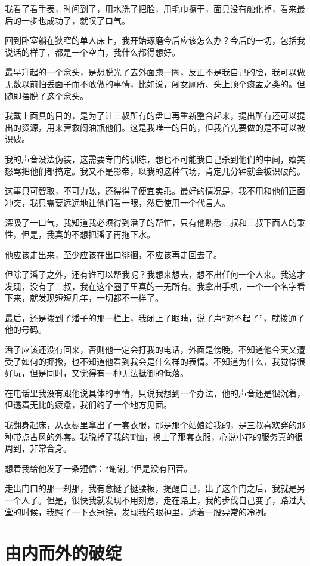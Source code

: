 我看了看手表，时间到了，用水洗了把脸，用毛巾擦干，面具没有融化掉，看来最后的一步也成功了，就叹了口气。

回到卧室躺在狭窄的单人床上，我开始琢磨今后应该怎么办？今后的一切，包括我说话的样子，都是一个空白，我什么都得想好。

最早升起的一个念头，是想脱光了去外面跑一圈，反正不是我自己的脸，我可以做无数以前怕丢面子而不敢做的事情，比如说，闯女厕所、头上顶个痰盂之类的。但随即摆脱了这个念头。

我戴上面具的目的，是为了让三叔所有的盘口再重新整合起来，提出所有还可以提出的资源，用来营救闷油瓶他们。这是我唯一的目的，但我首先要做的是不可以被识破。

我的声音没法伪装，这需要专门的训练，想也不可能我自己杀到他们的中间，嬉笑怒骂把他们都搞定。我又不是影帝，以我的这种气场，肯定几分钟就会被识破的。

这事只可智取，不可力敌，还得得了便宜卖乖。最好的情况是，我不用和他们正面冲突，我只需要远远地让他们看一眼，然后使用一个代言人。

深吸了一口气，我知道我必须得到潘子的帮忙，只有他熟悉三叔和三叔下面人的秉性，但是，我真的不想把潘子再拖下水。

他应该走出来，至少应该在出口徘徊，不应该再走回去了。

但除了潘子之外，还有谁可以帮我呢？我想来想去，想不出任何一个人来。我这才发现，没有了三叔，我在这个圈子里真的一无所有。我拿出手机，一个一个名字看下来，就发现短短几年，一切都不一样了。

最后，还是拨到了潘子的那一栏上，我闭上了眼睛，说了声“对不起了”，就拨通了他的号码。

潘子应该还没有回来，否则他一定会打我的电话，外面是傍晚，不知道他今天又遭受了如何的揶揄，也不知道他看到我会是什么样的表情。不知道为什么，我觉得很好玩，但是同时，又觉得有一种无法抵御的低落。

在电话里我没有跟他说具体的事情，只说我想到一个办法，他的声音还是很沉着，但透着无比的疲惫，我们约了一个地方见面。

我翻身起床，从衣橱里拿出了一套衣服，那是那个姑娘给我的，是三叔喜欢穿的那种带点古风的外套。我脱掉了我的T恤，换上了那套衣服，心说小花的服务真的很周到，非常合身。

想着我给他发了一条短信：“谢谢。”但是没有回音。

走出门口的那一刹那，我有意挺了挺腰板，提醒自己，出了这个门之后，我就是另一个人了。但是，很快我就发现不用刻意，走在路上，我的步伐自己变了，路过大堂的时候，我照了一下衣冠镜，发现我的眼神里，透着一股异常的冷冽。

\chapter{由内而外的破绽}

